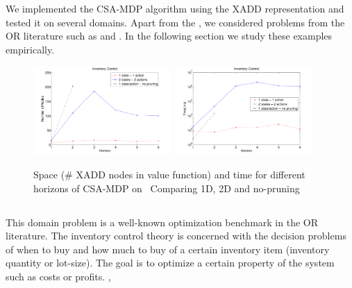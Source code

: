 \label{sec:results}
 
We implemented the CSA-MDP algorithm using the XADD representation and tested it on several domains. Apart from the \MarsRoverNL, we considered problems from the OR
literature such as \InventoryControl and \WaterReservoir. In the following
section we study these examples empirically.
 
\begin{figure}[t]
\centering
\includegraphics[width=0.47\textwidth]{Figures1/space1-3.pdf}
\hspace{5mm}
\includegraphics[width=0.47\textwidth]{Figures1/time1-3.pdf}
\caption{\footnotesize
Space (\# XADD nodes in value function) and
time for different horizons of CSA-MDP on \InventoryControl\
Comparing 1D, 2D and no-pruning}
\label{fig:invC}
\end{figure}
 
\subsection{\InventoryControl}
This domain problem is a well-known optimization benchmark in the OR
literature. The inventory control theory is concerned with the decision problems of when to buy and how much to buy of a certain inventory item (inventory quantity or lot-size). The goal is to optimize a certain property of the system such as costs or profits. \cite{Scarf2002}, \cite{Scarf_Karlin58} 

